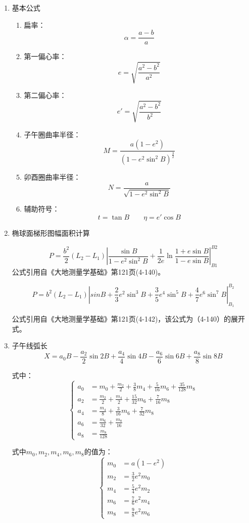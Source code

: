 \begin{enumerate}

 \item 基本公式

\begin{enumerate}
\item 扁率：
$$\alpha=\frac{a-b}{a}$$

\item 第一偏心率：
$$e=\sqrt{\frac{a^2-b^2}{a^2}}$$

\item 第二偏心率：
$$e'=\sqrt{\frac{a^{2}-b^{2}}{b^{2}}}$$

\item 子午圈曲率半径：
$$M=\frac{a(1-e^2)}{(1-e^2\sin ^2 B)^{\frac{3}{2}}}$$

\item 卯酉圈曲率半径：
$$N=\frac{a}{\sqrt{1-e^2\sin^2 B}}$$

\item 辅助符号：
$$t=\tan B\qquad\eta=e'\cos B$$
\end{enumerate}

\item 椭球面梯形图幅面积计算

$$P = \frac{b^2}{2}(L_2 - L_1) \left | \frac{\sin B}{1-e^2\sin^2 B} + \frac{1}{2e}\ln \frac{1+e\sin B}{1-e\sin B}\right |_{B1} ^{B2} $$
公式引用自《大地测量学基础》第121页(4-140)。

$$P=b^2(L_2 - L_1) \left | sinB + \frac{2}{3}e^2 \sin ^3 B + \frac{3}{5}e^4 \sin^5 B + \frac{4}{7}e^6 \sin ^7 B \right | _{B_1} ^{B_2}$$

公式引用自《大地测量学基础》第121页(4-142)，该公式为（4-140）的展开式。

\item 子午线弧长
$$X=a_0 B - \frac{a_2}{2}\sin 2B + \frac{a_4}{4}\sin 4B
- \frac{a_6}{6} \sin 6B  + \frac{a_8}{8}\sin 8B$$

式中：
\[
\left \{ \begin{aligned}
a_0 &= m_0 + \frac{m_2}{2} + \frac{3}{8}m_4 + \frac{5}{16}m_6 + \frac{35}{128}m_8  \\
a_2 &= \frac{m_2}{2} + \frac{m_4}{2} + \frac{15}{32}m_6 + \frac{7}{16}m_8  \\
a_4 &= \frac{m_4}{8} + \frac{3}{16}m_6 + \frac{7}{32}m_8  \\
a_6 &= \frac{m_6}{32} + \frac{m_8}{16}  \\
a_8 &= \frac{m_8}{128}
\end{aligned} \right.
\]

式中$m_0, m_2, m_4, m_6, m_8$的值为：
\[
\left \{ \begin{aligned}
m_0 &= a(1-e^2) \\
m_2 &= \frac{3}{2}e^2 m_0  \\
m_4 &= \frac{5}{4}e^2 m_2   \\
m_6 &= \frac{7}{6}e^2 m_4   \\
m_8 &= \frac{9}{8}e^2 m_6
\end{aligned} \right.
\]


\end{enumerate}
